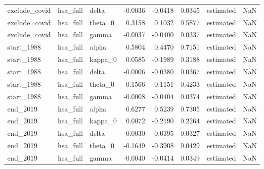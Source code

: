 \begin{tabular}{lllrrrlr}
exclude\_covid & hsa\_full & delta & -0.0036 & -0.0418 & 0.0345 & estimated & NaN \\
exclude\_covid & hsa\_full & theta\_0 & 0.3158 & 0.1032 & 0.5877 & estimated & NaN \\
exclude\_covid & hsa\_full & gamma & -0.0037 & -0.0400 & 0.0337 & estimated & NaN \\
start\_1988 & hsa\_full & alpha & 0.5804 & 0.4470 & 0.7151 & estimated & NaN \\
start\_1988 & hsa\_full & kappa\_0 & 0.0585 & -0.1989 & 0.3188 & estimated & NaN \\
start\_1988 & hsa\_full & delta & -0.0006 & -0.0380 & 0.0367 & estimated & NaN \\
start\_1988 & hsa\_full & theta\_0 & 0.1566 & -0.1151 & 0.4233 & estimated & NaN \\
start\_1988 & hsa\_full & gamma & -0.0008 & -0.0404 & 0.0374 & estimated & NaN \\
end\_2019 & hsa\_full & alpha & 0.6277 & 0.5239 & 0.7305 & estimated & NaN \\
end\_2019 & hsa\_full & kappa\_0 & 0.0072 & -0.2190 & 0.2264 & estimated & NaN \\
end\_2019 & hsa\_full & delta & -0.0030 & -0.0395 & 0.0327 & estimated & NaN \\
end\_2019 & hsa\_full & theta\_0 & -0.1649 & -0.3908 & 0.0429 & estimated & NaN \\
end\_2019 & hsa\_full & gamma & -0.0040 & -0.0414 & 0.0349 & estimated & NaN \\
\bottomrule
\end{tabular}

